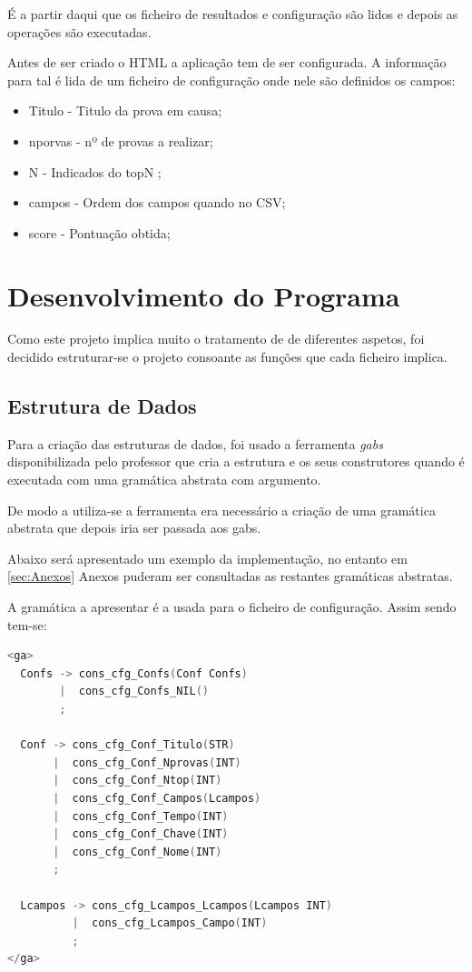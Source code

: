 \documentclass[11pt, a4paper, oneside]{article}
\begin{document}
É a partir daqui que os ficheiro de resultados e configuração são lidos e depois as operações são executadas. 

Antes de ser criado o HTML a aplicação tem de ser configurada.
A informação para tal é lida de um ficheiro de configuração onde nele são definidos os campos:
\begin{itemize}
\item Titulo - Titulo da prova em causa;
\item nporvas - nº de provas a realizar;
\item N - Indicados do topN ;
\item campos - Ordem dos campos quando no CSV;
\item score - Pontuação obtida;
\end{itemize}




\newpage

\section{Desenvolvimento do Programa}
Como este projeto implica muito o tratamento de de diferentes aspetos, foi decidido estruturar-se o projeto consoante as  funções que cada ficheiro implica.

\subsection{Estrutura de Dados}
Para a criação das estruturas de dados, foi usado a ferramenta \textit{gabs} disponibilizada pelo professor que cria a estrutura e os seus construtores quando é executada com uma gramática abstrata com argumento.

De modo a utiliza-se a ferramenta era necessário a criação de uma gramática abstrata que depois iria ser passada aos gabs.

Abaixo será apresentado um exemplo da implementação, no entanto em \ref{sec:Anexos} Anexos  puderam ser consultadas as restantes gramáticas abstratas.

A gramática a apresentar é a usada para o ficheiro de configuração. Assim sendo tem-se:
\begin{lstlisting}[language=C, caption={Gramática Abstrata Para o Ficheiro de configuração}]
<ga>
  Confs -> cons_cfg_Confs(Conf Confs)
        |  cons_cfg_Confs_NIL()
        ;

  Conf -> cons_cfg_Conf_Titulo(STR)
       |  cons_cfg_Conf_Nprovas(INT)
       |  cons_cfg_Conf_Ntop(INT)
       |  cons_cfg_Conf_Campos(Lcampos)
       |  cons_cfg_Conf_Tempo(INT)
       |  cons_cfg_Conf_Chave(INT)
       |  cons_cfg_Conf_Nome(INT)
       ;

  Lcampos -> cons_cfg_Lcampos_Lcampos(Lcampos INT)
          |  cons_cfg_Lcampos_Campo(INT)
          ;
</ga>
\end{lstlisting}
\end{document}
